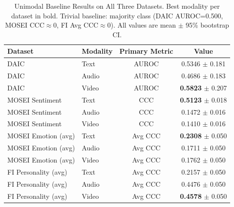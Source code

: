 \begin{table}[htbp]
\centering
\caption{Unimodal Baseline Results on All Three Datasets. Best modality per dataset in bold. Trivial baseline: majority class (DAIC AUROC=0.500, MOSEI CCC$\approx$0, FI Avg CCC$\approx$0). All values are mean $\pm$ 95\% bootstrap CI.}
\label{tab:unimodal_results}
\begin{tabular}{llcc}
\toprule
Dataset & Modality & Primary Metric & Value \\
\midrule
DAIC & Text & AUROC & 0.5346 $\pm$ 0.181 \\
DAIC & Audio & AUROC & 0.4686 $\pm$ 0.183 \\
DAIC & Video & AUROC & \textbf{0.5823} $\pm$ 0.207 \\[4pt]
MOSEI Sentiment & Text & CCC & \textbf{0.5123} $\pm$ 0.018 \\
MOSEI Sentiment & Audio & CCC & 0.1472 $\pm$ 0.016 \\
MOSEI Sentiment & Video & CCC & 0.1410 $\pm$ 0.016 \\[4pt]
MOSEI Emotion (avg) & Text & Avg CCC & \textbf{0.2308} $\pm$ 0.050 \\
MOSEI Emotion (avg) & Audio & Avg CCC & 0.1711 $\pm$ 0.050 \\
MOSEI Emotion (avg) & Video & Avg CCC & 0.1762 $\pm$ 0.050 \\[4pt]
FI Personality (avg) & Text & Avg CCC & 0.2157 $\pm$ 0.050 \\
FI Personality (avg) & Audio & Avg CCC & 0.4476 $\pm$ 0.050 \\
FI Personality (avg) & Video & Avg CCC & \textbf{0.4578} $\pm$ 0.050 \\
\bottomrule
\end{tabular}
\end{table}
